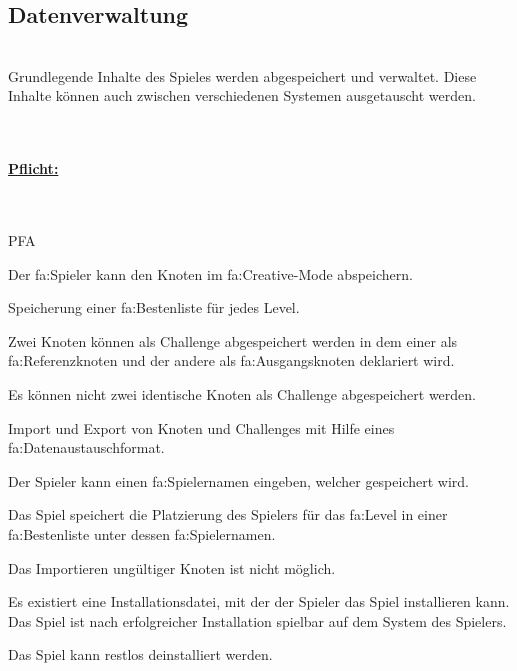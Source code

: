 %
%


\subsection{Datenverwaltung}

%
%
\renewcommand{\K}{}
%
%

~\\
Grundlegende Inhalte des Spieles werden abgespeichert und verwaltet.
Diese Inhalte können auch zwischen verschiedenen Systemen ausgetauscht werden.

~\\

%
%
\paragraph*{\underline{Pflicht:}}~\\

\begin{ids}{\gls{PFA\K}}

	\id[ 390] Der \gls{fa:Spieler} kann den Knoten im \gls{fa:Creative}-Mode abspeichern.
	
	\id[ 400]Speicherung einer \gls{fa:Bestenliste} für jedes Level.
	
	\id[ 410] Zwei Knoten können als Challenge abgespeichert werden in dem einer als \gls{fa:Referenzknoten} und der andere als \gls{fa:Ausgangsknoten} deklariert wird.
	
	\id[420] Es können nicht zwei identische Knoten als Challenge abgespeichert werden.
	
	\id[ 430] Import und Export von Knoten und Challenges mit Hilfe eines \gls{fa:Datenaustauschformat}.
	
	\id[ 440] Der Spieler kann einen \gls{fa:Spielername}n eingeben, welcher gespeichert wird.
	
	\id[ 450] Das Spiel speichert die Platzierung des Spielers  für das \gls{fa:Level} in einer \gls{fa:Bestenliste} unter dessen \gls{fa:Spielername}n.
	
	\id[ 460] Das Importieren ungültiger Knoten ist nicht möglich.
	
	\id[ 470] Es existiert eine Installationsdatei, mit der der Spieler das Spiel installieren kann. Das Spiel ist nach erfolgreicher Installation spielbar auf dem System des Spielers.
	
	\id[ 475] Das Spiel kann restlos deinstalliert werden. 
	
\end{ids}

